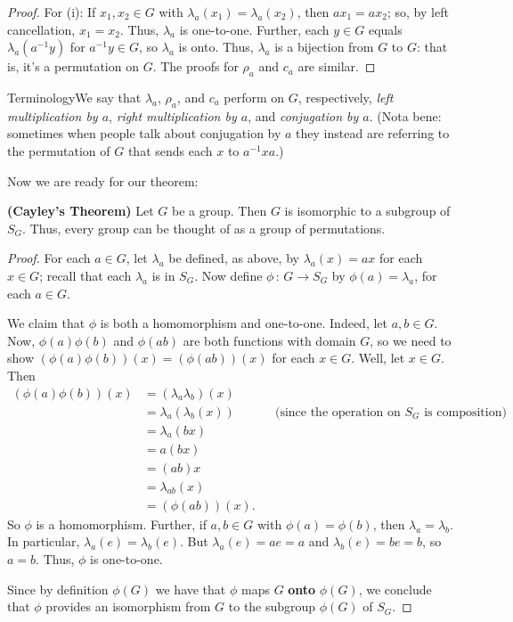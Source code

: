 \begin{proof} For (i): If $x_1,x_2 \in G$ with
$\lambda_a(x_1)=\lambda_a(x_2)$, then $ax_1=ax_2$; so, by left
cancellation, $x_1=x_2$.  Thus, $\lambda_a$ is one-to-one. Further,
each $y\in G$ equals $\lambda_a(a^{-1}y)$ for $a^{-1}y\in G$, so
$\lambda_a$ is onto.  Thus, $\lambda_a$ is a bijection from $G$ to
$G$: that is, it's a permutation on $G$. The proofs for $\rho_a$ and
$c_a$ are similar.\end{proof}

\begin{df}{Terminology}We say that $\lambda_a$, $\rho_a$, and $c_a$
perform on $G$, respectively, \textit{left multiplication by $a$}, \textit{right multiplication by $a$}, and \textit{conjugation by $a$}. (Nota
bene: sometimes when people talk about conjugation by $a$ they
instead are referring to the permutation of $G$ that sends each $x$
to $a^{-1}xa$.)\end{df}

Now we are ready for our theorem:

\begin{thm}\label{}\textbf{(Cayley's Theorem)} Let $G$ be a group.  Then $G$
is isomorphic to a subgroup of $S_G$. Thus, every group can be
thought of as a group of permutations.\end{thm}

\begin{proof} For each $a\in G$, let $\lambda_a$ be defined, as above, by
$\lambda_a(x)=ax$ for each $x\in G$; recall that each $\lambda_a$ is
in $S_G$.  Now define $\phi\,:\, G\to S_G$ by $\phi(a)=\lambda_a$,
for each $a\in G$.

We claim that $\phi$ is both a homomorphism and one-to-one.  Indeed,
let $a,b\in G$.  Now, $\phi(a)\phi(b)$ and $\phi(ab)$ are both
functions with domain $G$, so we need to show
$(\phi(a)\phi(b))(x)=(\phi(ab))(x)$ for each $x\in G$.  Well, let
$x\in G$.  Then
\begin{align*}
(\phi(a)\phi(b))(x)&=(\lambda_a\lambda_b)(x)&&\\
&=\lambda_a(\lambda_b(x)) &&\text{(since the operation on $S_G$ is
 composition)}\\
&=\lambda_a(bx)&&\\
&=a(bx)&&\\
&=(ab)x&&\\
&=\lambda_{ab}(x)&&\\
&=(\phi(ab))(x).&&
\end{align*}
So $\phi$ is a homomorphism.  Further, if $a, b\in G$ with
$\phi(a)=\phi(b)$, then $\lambda_a=\lambda_b$.  In particular,
$\lambda_a(e)=\lambda_b(e)$.  But $\lambda_a(e)=ae=a$ and
$\lambda_b(e)=be=b$, so $a=b$.  Thus, $\phi$ is one-to-one.

Since by definition $\phi(G)$ we have that $\phi$ maps $G$ \textbf{onto} $\phi(G)$, we conclude that $\phi$ provides an isomorphism
from $G$ to the subgroup $\phi(G)$ of $S_G$.\end{proof}

